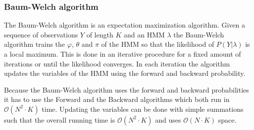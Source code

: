 \subsubsection{Baum-Welch algorithm}

The Baum-Welch \cite{Bishop} algorithm is an expectation maximization algorithm. Given a sequence of observations $Y$ of length $K$ and an HMM $\lambda$ the Baum-Welch algorithm trains the $\varphi$, $\theta$ and $\pi$ of the HMM so that the likelihood of $P(Y|\lambda)$ is a local maximum. This is done in an iterative procedure for a fixed amount of iterations or until the likelihood converges. In each iteration the algorithm updates the variables of the HMM using the forward and backward probability.

Because the Baum-Welch algorithm uses the forward and backward probabilities it has to use the Forward and the Backward algorithms which both run in $\mathcal{O}( N ^2\cdot K)$ time. Updating the variables can be done with simple summations such that the overall running time is $\mathcal{O}( N ^2\cdot K)$ and uses $\mathcal{O}( N \cdot K)$ space.